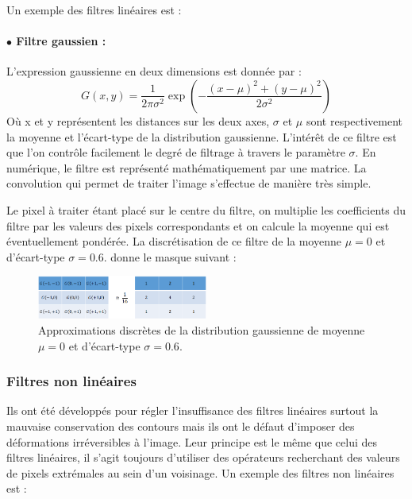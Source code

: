 Un exemple des filtres linéaires est :
\paragraph{ $\bullet$ Filtre gaussien :}
L’expression gaussienne en deux dimensions est donnée par :
\begin{equation}
  G(x, y) = \frac{1}{2\pi \sigma^2} \exp(-\frac{(x-\mu)^2+(y-\mu)^2}{2 \sigma^2})
\end{equation}
Où x et y représentent les distances sur les deux axes, $\sigma$ et $\mu $ sont respectivement la moyenne et l’écart-type de la distribution gaussienne. L’intérêt de ce filtre est que l’on contrôle facilement le degré de filtrage à travers le paramètre $\sigma$. En numérique, le filtre est représenté mathématiquement par une matrice. La convolution qui permet de traiter l'image s'effectue de manière très simple.

Le pixel à traiter étant placé sur le centre du filtre, on multiplie les
coefficients du filtre par les valeurs des pixels correspondants et on calcule la moyenne qui est éventuellement pondérée. La discrétisation de ce filtre de la moyenne $\mu = 0$  et d’écart-type $\sigma = 0.6$. donne le masque suivant :

\begin{figure}[H]
	\centering
	\includegraphics[width=0.5\textwidth]{Figures/gaussien} 
	\caption{Approximations discrètes de la distribution gaussienne de
		moyenne $\mu = 0$  et d’écart-type $\sigma = 0.6$.}
\end{figure}

\subsubsection{Filtres non linéaires}
Ils ont été développés pour régler l’insuffisance des filtres linéaires
surtout la mauvaise conservation des contours mais ils ont le défaut
d’imposer des déformations irréversibles à l’image. Leur principe est le même
que celui des filtres linéaires, il s’agit toujours d’utiliser des opérateurs
recherchant des valeurs de pixels extrémales au sein d’un voisinage.
Un exemple des filtres non linéaires est :

